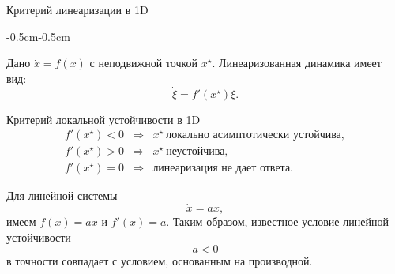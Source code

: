 \documentclass{beamer}
\begin{document}
	\begin{frame}{Критерий линеаризации в 1D}
		\begin{flushleft}
			\begin{adjustwidth}{-0.5cm}{-0.5cm}
				
				Дано \(\dot{x}=f(x)\) с неподвижной точкой \(x^\star\). Линеаризованная динамика имеет вид:
				\[
				\dot{\xi}=f'(x^\star)\xi.
				\]
				
				\begin{block}{Критерий локальной устойчивости в 1D}
					\[
					\begin{array}{rcl}
						f'(x^\star)<0
						&\Longrightarrow&
						x^\star\ \text{локально асимптотически устойчива},\\[0.2cm]
						f'(x^\star)>0
						&\Longrightarrow&
						x^\star\ \text{неустойчива},\\[0.2cm]
						f'(x^\star)=0
						&\Longrightarrow&
						\text{линеаризация не дает ответа.}
					\end{array}
					\]
				\end{block}
				
				
				Для линейной системы
				\[
				\dot{x}=ax,
				\]
				имеем \(f(x)=ax\) и \(f'(x)=a\). Таким образом, известное условие линейной устойчивости
				\[
				a<0
				\]
				в точности совпадает с условием, основанным на производной.
				
			\end{adjustwidth}
		\end{flushleft}
	\end{frame}
	
	
	
\end{document}
